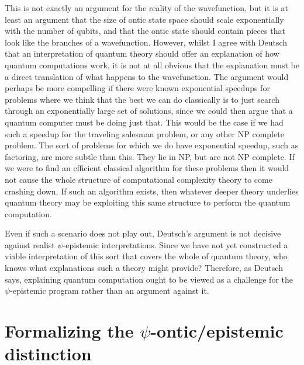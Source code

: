 \documentclass[DIV=calc,paper=a4,fontsize=11pt,twocolumn]{scrartcl} %
\theoremstyle{definition}
\theoremstyle{plain}
\begin{document}
This is not exactly an argument for the reality of the wavefunction,
but it is at least an argument that the size of ontic state space
should scale exponentially with the number of qubits, and that the
ontic state should contain pieces that look like the branches of a
wavefunction.  However, whilst I agree with Deutsch that an
interpretation of quantum theory should offer an explanation of how
quantum computations work, it is not at all obvious that the
explanation must be a direct translation of what happens to the
wavefunction.  The argument would perhaps be more compelling if there
were known exponential speedups for problems where we think that the
best we can do classically is to just search through an exponentially
large set of solutions, since we could then argue that a quantum
computer must be doing just that.  This would be the case if we had
such a speedup for the traveling salesman problem, or any other NP
complete problem.  The sort of problems for which we do have
exponential speedup, such as factoring, are more subtle than this.
They lie in NP, but are not NP complete.  If we were to find an
efficient classical algorithm for these problems then it would not
cause the whole structure of computational complexity theory to come
crashing down.  If such an algorithm exists, then whatever deeper
theory underlies quantum theory may be exploiting this same structure
to perform the quantum computation.

Even if such a scenario does not play out, Deutsch's argument is not
decisive against realist $\psi$-epistemic interpretations.  Since we
have not yet constructed a viable interpretation of this sort that
covers the whole of quantum theory, who knows what explanations such a
theory might provide?  Therefore, as Deutsch says, explaining quantum
computation ought to be viewed as a challenge for the $\psi$-epistemic
program rather than an argument against it.

\section{Formalizing the $\psi$-ontic/epistemic distinction}

\label{Form}
\end{document}
